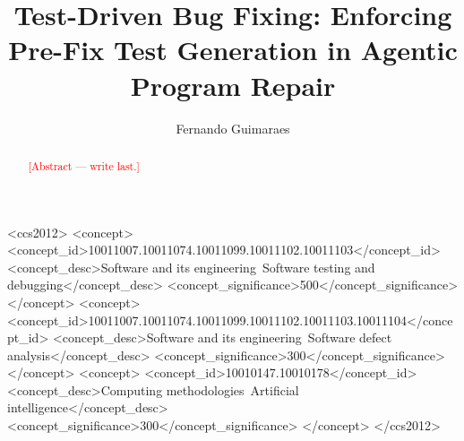 \documentclass[acmsmall,screen]{acmart}
\newcommand{\ph}[1]{\textcolor{red}{[#1]}}
\begin{document}
\title{Test-Driven Bug Fixing: Enforcing Pre-Fix Test Generation in Agentic
Program Repair}

\author{Fernando Guimaraes}


\renewcommand{\shortauthors}{Guimaraes}

\begin{abstract}
\ph{Abstract — write last.}
\end{abstract}

\begin{CCSXML}
<ccs2012>
   <concept>
       <concept_id>10011007.10011074.10011099.10011102.10011103</concept_id>
       <concept_desc>Software and its engineering~Software testing and debugging</concept_desc>
       <concept_significance>500</concept_significance>
       </concept>
   <concept>
       <concept_id>10011007.10011074.10011099.10011102.10011103.10011104</concept_id>
       <concept_desc>Software and its engineering~Software defect analysis</concept_desc>
       <concept_significance>300</concept_significance>
       </concept>
   <concept>
       <concept_id>10010147.10010178</concept_id>
       <concept_desc>Computing methodologies~Artificial intelligence</concept_desc>
       <concept_significance>300</concept_significance>
       </concept>
 </ccs2012>
\end{CCSXML}
\end{document}
